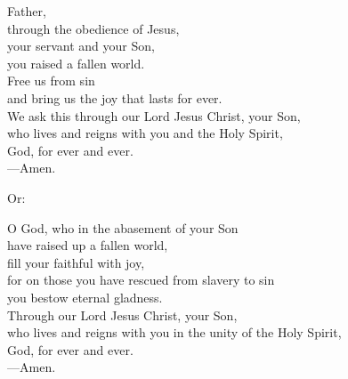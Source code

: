 \prayer


\begin{prayerverse}
Father,\\
through the obedience of Jesus,\\
your servant and your Son,\\
you raised a fallen world.\\
Free us from sin\\
and bring us the joy that lasts for ever.\\
We ask this through our Lord Jesus Christ, your Son,\\
who lives and reigns with you and the Holy Spirit,\\
God, for ever and ever.\\
{\color{red}---\thinspace}Amen.

{\color{red}Or:}

O God, who in the abasement of your Son\\
have raised up a fallen world,\\
fill your faithful with joy,\\
for on those you have rescued from slavery to sin\\
you bestow eternal gladness.\\
Through our Lord Jesus Christ, your Son,\\
who lives and reigns with you in the unity of the Holy Spirit,\\
God, for ever and ever.\\
{\color{red}---\thinspace}Amen.
\end{prayerverse}

